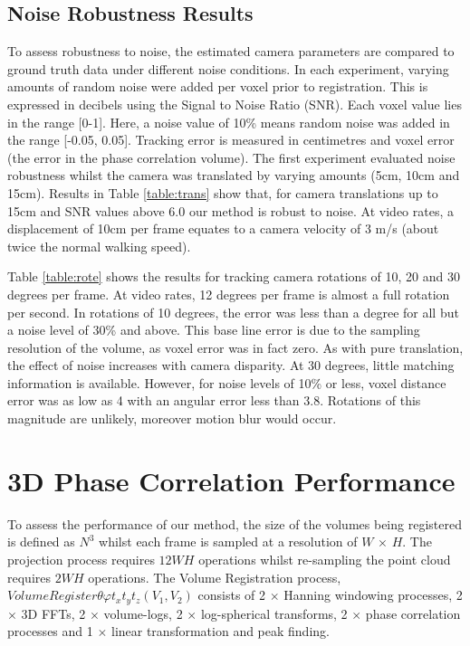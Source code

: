 \subsection{Noise Robustness Results}




To assess robustness to noise, the estimated camera parameters are compared to ground truth data under different noise conditions. In each experiment, varying amounts of random noise were added per voxel prior to registration. This is expressed in decibels using the Signal to Noise Ratio (SNR). Each voxel value lies in the range [0-1]. Here, a noise value of 10\% means random noise was added in the range [-0.05, 0.05]. Tracking error is measured in centimetres and voxel error (the error in the phase correlation volume). The first experiment evaluated noise robustness whilst the camera was translated by varying amounts (5cm, 10cm and 15cm). Results in Table \ref{table:trans} show that, for camera translations up to 15cm and SNR values above 6.0 our method is robust to noise. At video rates, a displacement of 10cm per frame equates to a camera velocity of 3 m/s (about twice the normal walking speed). 


Table \ref{table:rote} shows the results for tracking camera rotations of 10, 20 and 30 degrees per frame. At video rates, 12 degrees per frame is almost a full rotation per second. In rotations of 10 degrees, the error was less than a degree for all but a noise level of 30\% and above. This base line error is due to the sampling resolution of the volume, as voxel error was in fact zero. As with pure translation, the effect of noise increases with camera disparity. At 30 degrees, little matching information is available. However, for noise levels of 10\% or less, voxel distance error was as low as 4 with an angular error less than 3.8. Rotations of this magnitude are unlikely, moreover motion blur would occur.

\section{3D Phase Correlation Performance}

To assess the performance of our method, the size of the volumes being registered is defined as $N^3$ whilst each frame is sampled at a resolution of $W$ $\times$ $H$. The projection process requires $12WH$ operations whilst re-sampling the point cloud requires $2WH$ operations. The Volume Registration process, $VolumeRegister{\theta \varphi t_x t_y t_z}(V_1, V_2)$ consists of 2 $\times$ Hanning windowing processes, 2 $\times$ 3D FFTs, 2 $\times$ volume-logs, 2 $\times$ log-spherical transforms, 2 $\times$ phase correlation processes and 1 $\times$ linear transformation and peak finding. 

